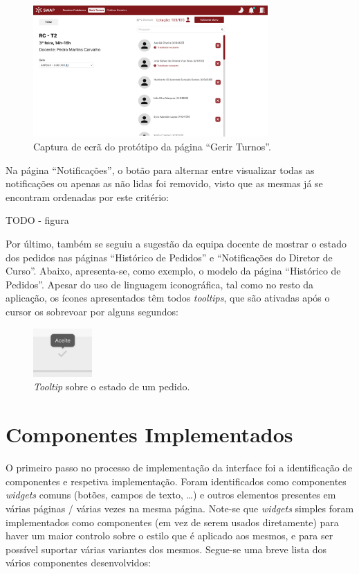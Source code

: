 \documentclass[12pt, a4paper]{article}
\begin{document}
\begin{figure}[H]
    \centering
    \includegraphics[width=0.8\textwidth]{res/prototype/gerir-turnos-revisto.png}
    \caption{Captura de ecrã do protótipo da página ``Gerir Turnos''.}
    \label{gerir-turnos-revisto}
\end{figure}

Na página ``Notificações'', o botão para alternar entre visualizar todas as notificações ou apenas
as não lidas foi removido, visto que as mesmas já se encontram ordenadas por este critério:

{\color{red} TODO - figura}

Por último, também se seguiu a sugestão da equipa docente de mostrar o estado dos pedidos nas
páginas ``Histórico de Pedidos'' e ``Notificações do Diretor de Curso''. Abaixo, apresenta-se, como
exemplo, o modelo da página ``Histórico de Pedidos''. Apesar do uso de linguagem iconográfica, tal
como no resto da aplicação, os ícones apresentados têm todos \emph{tooltips}, que são ativadas após
o cursor os sobrevoar por alguns segundos:

\begin{figure}[H]
    \centering
    \includegraphics[width=0.2\textwidth]{res/prototype/estado-pedido-tooltip.png}
    \caption{\emph{Tooltip} sobre o estado de um pedido.}
    \label{estado-pedido-tooltip}
\end{figure}

\section{Componentes Implementados}

O primeiro passo no processo de implementação da interface foi a identificação de componentes e
respetiva implementação. Foram identificados como componentes \emph{widgets} comuns (botões, campos
de texto, \ldots) e outros elementos presentes em várias páginas / várias vezes na mesma página.
Note-se que \emph{widgets} simples foram implementados como componentes (em vez de serem usados
diretamente) para haver um maior controlo sobre o estilo que é aplicado aos mesmos, e para ser
possível suportar várias variantes dos mesmos. Segue-se uma breve lista dos vários componentes
desenvolvidos:
\end{document}
